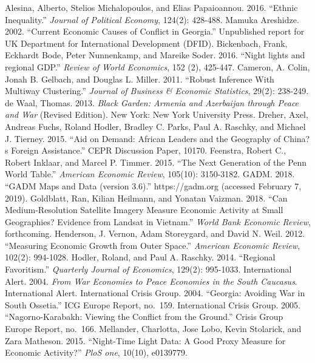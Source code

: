 \documentclass[12pt,a4paper]{article}%
\begin{document}
\begin{thebibliography}{99}                                                                                                %
\bibitem{} Alesina, Alberto, Stelios Michalopoulos, and Elias Papaioannou. 2016. ``Ethnic Inequality.'' \textit{Journal of Political Economy}, 124(2): 428-488.
\bibitem{} Mamuka Areshidze. 2002. ``Current Economic Causes of Conflict in Georgia.'' Unpublished report for UK Department for International Development (DFID).
\bibitem{} Bickenbach, Frank, Eckhardt Bode, Peter Nunnenkamp, and Mareike Soder. 2016. ``Night lights and regional GDP.'' \textit{Review of World Economics}, 152 (2), 425-447.                                                                                         
\bibitem{} Cameron, A. Colin, Jonah B. Gelbach, and Douglas L. Miller. 2011. ``Robust Inference With Multiway Clustering.'' \textit{Journal of Business \& Economic Statistics}, 29(2): 238-249.
\bibitem{} de Waal, Thomas. 2013. \textit{Black Garden: Armenia and Azerbaijan through Peace and War} (Revised Edition). New York: New York University Press.
\bibitem{} Dreher, Axel, Andreas Fuchs, Roland Hodler, Bradley C. Parks, Paul A. Raschky, and Michael J. Tierney. 2015. ``Aid on Demand: African Leaders and the Geography of China?s Foreign Assistance.'' CEPR Discussion Paper, 10170.
\bibitem{} Feenstra, Robert C., Robert Inklaar, and Marcel P. Timmer. 2015. ``The Next Generation of the Penn World Table.'' \textit{American Economic Review}, 105(10): 3150-3182.
\bibitem{} GADM. 2018. ``GADM Maps and Data (version 3.6).'' https://gadm.org (accessed February 7, 2019).
\bibitem{} Goldblatt, Ran, Kilian Heilmann, and Yonatan Vaizman. 2018. ``Can Medium-Resolution Satellite Imagery Measure Economic Activity at Small Geographies? Evidence from Landsat in Vietnam.'' \textit{World Bank Economic Review}, forthcoming.
\bibitem{} Henderson, J. Vernon, Adam Storeygard, and David N. Weil. 2012. ``Measuring Economic Growth from Outer Space.'' \textit{American Economic Review}, 102(2): 994-1028.
\bibitem{} Hodler, Roland, and Paul A. Raschky. 2014. ``Regional Favoritism.'' \textit{Quarterly Journal of Economics}, 129(2): 995-1033.
\bibitem{} International Alert. 2004. \textit{From War Economies to Peace Economies in the South Caucasus}. International Alert.
\bibitem{} International Crisis Group. 2004. ``Georgia: Avoiding War in South Ossetia.'' ICG Europe Report, no.\ 159.
\bibitem{} International Crisis Group. 2005. ``Nagorno-Karabakh: Viewing the Conflict from the Ground.'' Crisis Group Europe Report, no.\ 166.
\bibitem{} Mellander, Charlotta, Jose Lobo, Kevin Stolarick, and Zara Matheson. 2015. ``Night-Time Light Data: A Good Proxy Measure for Economic Activity?'' \textit{PloS one}, 10(10), e0139779.

\end{thebibliography}
\end{document}
